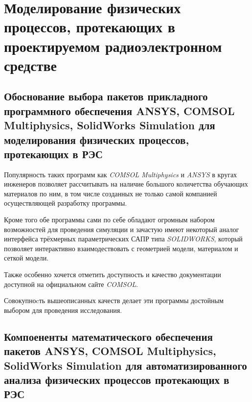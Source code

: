 \section{Моделирование 
  физических процессов,
  протекающих в проектируемом
  радиоэлектронном средстве}

  
  


\subsection{Обоснование выбора пакетов 
  прикладного программного обеспечения 
  ANSYS, COMSOL Multiphysics, SolidWorks Simulation
 для моделирования физических процессов, протекающих в РЭС}

Популярность таких программ как \textit{COMSOL Multiphysics} и
\textit{ANSYS} в кругах инженеров позволяет рассчитывать на наличие
большого количетства обучающих материалов по ним, в том числе
созданных не только самой компанией осуществляющей разработку
программы.

Кроме того обе программы сами по себе обладают огромным набором
возможностей для проведения симуляции и зачастую имеют некоторый
аналог интерфейса трёхмерных параметрических САПР типа
\textit{SOLIDWORKS}, который позволяет интерактивно взаимодествовать с
геометрией модели, материалом и сеткой модели.

Также особенно хочется отметить доступность и качество документации
доступной на официальном сайте \textit{COMSOL}.

Совокупноcть вышеописанных качеств делает эти программы достойным
выбором для проведения исследования.

\subsection{Компоененты математического обеспечения пакетов
  ANSYS, COMSOL Multiphysics, SolidWorks Simulation
  для автоматизированного анализа физических процессов протекающих в РЭС}

